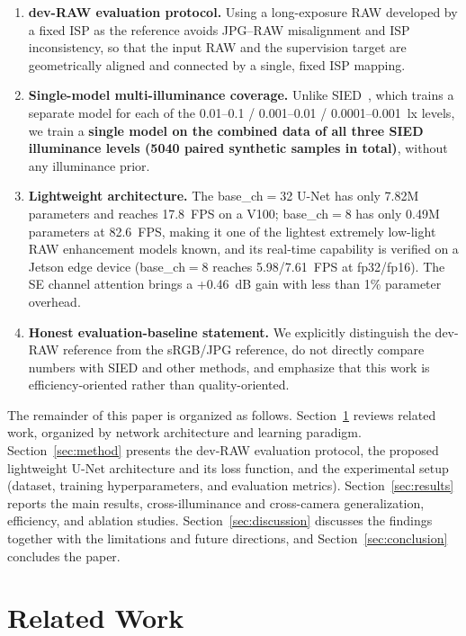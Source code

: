 \documentclass[remotesensing,article,accept,moreauthors]{Definitions/mdpi}
\begin{document}
\begin{enumerate}
\item \textbf{dev-RAW evaluation protocol.} Using a long-exposure RAW developed by a fixed ISP as the reference avoids JPG--RAW misalignment and ISP inconsistency, so that the input RAW and the supervision target are geometrically aligned and connected by a single, fixed ISP mapping.
\item \textbf{Single-model multi-illuminance coverage.} Unlike SIED~\citep{jiang2025sied}, which trains a separate model for each of the 0.01--0.1 / 0.001--0.01 / 0.0001--0.001~lx levels, we train a \textbf{single model on the combined data of all three SIED illuminance levels (5040 paired synthetic samples in total)}, without any illuminance prior.
\item \textbf{Lightweight architecture.} The base\_ch$=$32 U-Net has only 7.82M parameters and reaches 17.8~FPS on a V100; base\_ch$=$8 has only 0.49M parameters at 82.6~FPS, making it one of the lightest extremely low-light RAW enhancement models known, and its real-time capability is verified on a Jetson edge device (base\_ch$=$8 reaches 5.98/7.61~FPS at fp32/fp16). The SE channel attention brings a +0.46~dB gain with less than 1\% parameter overhead.
\item \textbf{Honest evaluation-baseline statement.} We explicitly distinguish the dev-RAW reference from the sRGB/JPG reference, do not directly compare numbers with SIED and other methods, and emphasize that this work is efficiency-oriented rather than quality-oriented.
\end{enumerate}

The remainder of this paper is organized as follows. Section~\ref{sec:related} reviews related work, organized by network architecture and learning paradigm. Section~\ref{sec:method} presents the dev-RAW evaluation protocol, the proposed lightweight U-Net architecture and its loss function, and the experimental setup (dataset, training hyperparameters, and evaluation metrics). Section~\ref{sec:results} reports the main results, cross-illuminance and cross-camera generalization, efficiency, and ablation studies. Section~\ref{sec:discussion} discusses the findings together with the limitations and future directions, and Section~\ref{sec:conclusion} concludes the paper.

\section{Related Work}
\label{sec:related}
\end{document}
